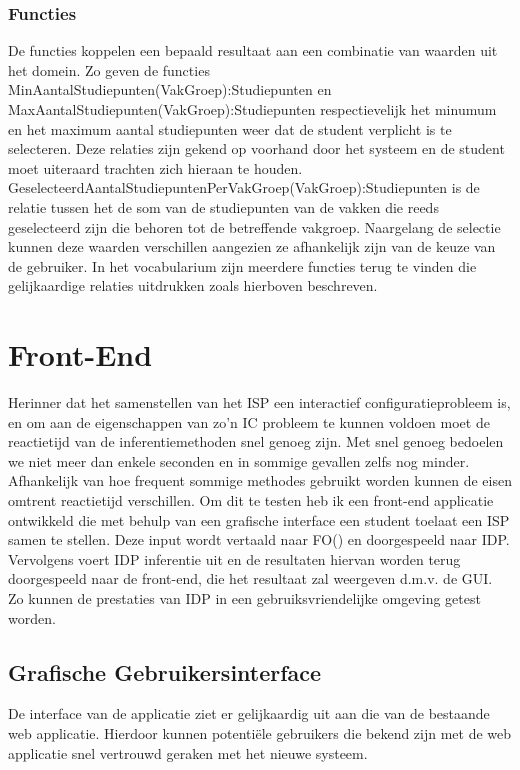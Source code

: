 \subsubsection{Functies}
De functies koppelen een bepaald resultaat aan een combinatie van waarden uit het domein. Zo geven de functies MinAantalStudiepunten(VakGroep):Studiepunten en MaxAantalStudiepunten(VakGroep):Studiepunten respectievelijk het minumum en het maximum aantal studiepunten weer dat de student verplicht is te selecteren. Deze relaties zijn gekend op voorhand door het systeem en de student moet uiteraard trachten zich hieraan te houden. GeselecteerdAantalStudiepuntenPerVakGroep(VakGroep):Studiepunten is de relatie tussen het de som van de studiepunten van de vakken die reeds geselecteerd zijn die behoren tot de betreffende vakgroep. Naargelang de selectie kunnen deze waarden verschillen aangezien ze afhankelijk zijn van de keuze van de gebruiker. In het vocabularium zijn meerdere functies terug te vinden die gelijkaardige relaties uitdrukken zoals hierboven beschreven. 

\section{Front-End}
Herinner dat het samenstellen van het ISP een interactief configuratieprobleem is, en om aan de eigenschappen van zo'n IC probleem te kunnen voldoen moet de reactietijd van de inferentiemethoden snel genoeg zijn. Met snel genoeg bedoelen we niet meer dan enkele seconden en in sommige gevallen zelfs nog minder. Afhankelijk van hoe frequent sommige methodes gebruikt worden kunnen de eisen omtrent reactietijd verschillen. Om dit te testen heb ik een front-end applicatie ontwikkeld die met behulp van een grafische interface een student toelaat een ISP samen te stellen. Deze input wordt vertaald naar FO(\textperiodcentered) en doorgespeeld naar IDP. Vervolgens voert IDP inferentie uit en de resultaten hiervan worden terug doorgespeeld naar de front-end, die het resultaat zal weergeven d.m.v. de GUI. Zo kunnen de prestaties van IDP in een gebruiksvriendelijke omgeving getest worden. 

\subsection{Grafische Gebruikersinterface}
De interface van de applicatie ziet er gelijkaardig uit aan die van de bestaande web applicatie. Hierdoor kunnen potenti\"{e}le gebruikers die bekend zijn met de web applicatie snel vertrouwd geraken met het nieuwe systeem. 

